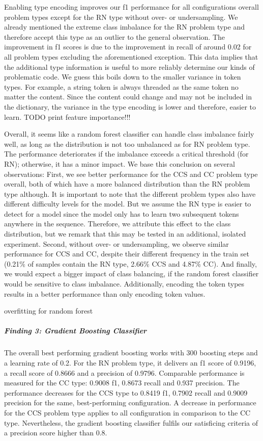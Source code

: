 Enabling type encoding improves our f1 performance for all configurations overall problem types except for the RN type without over- or undersampling. We already mentioned the extreme class imbalance for the RN problem type and therefore accept this type as an outlier to the general observation. The improvement in f1 scores is due to the improvement in recall of around 0.02 for all problem types excluding the aforementioned exception. This data implies that the additional type information is useful to more reliably determine our kinds of problematic code. We guess this boils down to the smaller variance in token types. For example, a string token is always threaded as the same token no matter the content. Since the content could change and may not be included in the dictionary, the variance in the type encoding is lower and therefore, easier to learn. TODO print feature importance!!!

Overall, it seems like a random forest classifier can handle class imbalance fairly well, as long as the distribution is not too unbalanced as for RN problem type. The performance deteriorates if the imbalance exceeds a critical threshold (for RN); otherwise, it has a minor impact.
We base this conclusion on several observations: First, we see better performance for the CCS and CC problem type overall, both of which have a more balanced distribution than the RN problem type although. It is important to note that the different problem types also have different difficulty levels for the model. But we assume the RN type is easier to detect for a model since the model only has to learn two subsequent tokens anywhere in the sequence. Therefore, we attribute this effect to the class distribution, but we remark that this may be tested in an additional, isolated experiment. Second, without over- or undersampling, we observe similar performance for CCS and CC, despite their different frequency in the train set (0.21\% of samples contain the RN type, 2.66\% CCS and 4.87\% CC). And finally, we would expect a bigger impact of class balancing, if the random forest classifier would be sensitive to class imbalance.
Additionally, encoding the token types results in a better performance than only encoding token values.

overfitting for random forest

\subparagraph{Finding 3: Gradient Boosting Classifier}
The overall best performing gradient boosting works with 300 boosting steps and a learning rate of 0.2. For the RN problem type, it delivers an f1 score of 0.9196, a recall score of 0.8666 and a precision of 0.9796. Comparable performance is measured for the CC type: 0.9008 f1, 0.8673 recall and 0.937 precision. The performance decreases for the CCS type to 0.8419 f1, 0.7902 recall and 0.9009 precision for the same, best-performing configuration. A decrease in performance for the CCS problem type applies to all configuration in comparison to the CC type. Nevertheless, the gradient boosting classifier fulfils our satisficing criteria of a precision score higher than 0.8.

